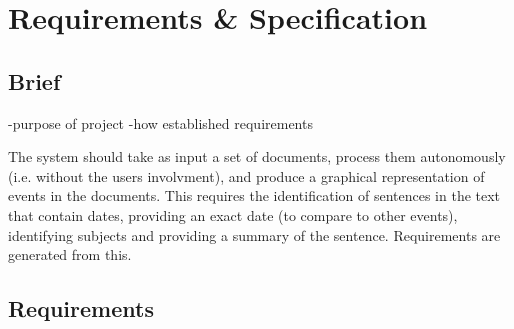 \chapter{Requirements \& Specification}
\section{Brief}
-purpose of project
-how established requirements
\par The system should take as input a set of documents, process them autonomously (i.e. without the users involvment), and produce a graphical representation of events in the documents. This requires the identification of sentences in the text that contain dates, providing an exact date (to compare to other events), identifying subjects and providing a summary of the sentence. Requirements are generated from this.

\section {Requirements}
